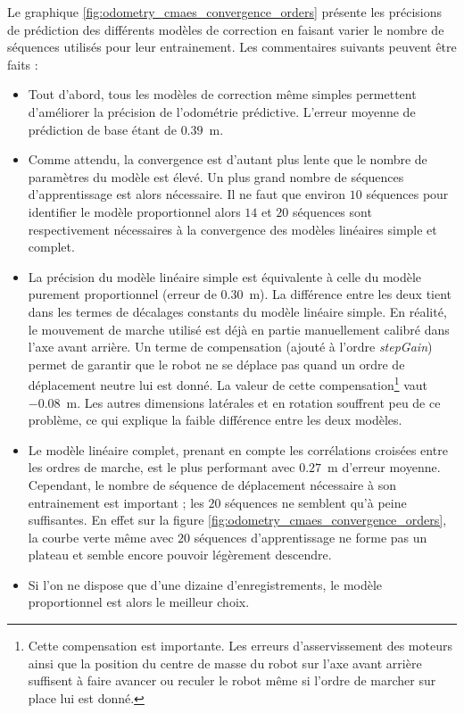 Le graphique \ref{fig:odometry_cmaes_convergence_orders} présente les précisions
de prédiction des différents modèles de correction
en faisant varier le nombre de séquences utilisés pour leur entrainement.
Les commentaires suivants peuvent être faits :
\begin{itemize}
    \item Tout d'abord, tous les modèles de correction 
        même simples permettent d'améliorer la précision 
        de l'odométrie prédictive.
        L'erreur moyenne de prédiction de base étant 
        de $0.39$~m.
    \item Comme attendu, la convergence est d'autant plus lente
        que le nombre de paramètres du modèle est élevé.
        Un plus grand nombre de séquences d'apprentissage est alors nécessaire.
        Il ne faut que environ $10$ séquences pour identifier le modèle
        proportionnel alors $14$ et $20$ séquences sont respectivement
        nécessaires à la convergence des modèles linéaires simple et complet.
    \item La précision du modèle linéaire simple est équivalente à celle
        du modèle purement proportionnel (erreur de $0.30$~m).
        La différence entre les deux tient dans les termes de décalages 
        constants du modèle linéaire simple.
        En réalité, le mouvement de marche utilisé est déjà en partie 
        manuellement calibré dans l'axe avant arrière.
        Un terme de compensation (ajouté à l'ordre \textit{stepGain}) permet
        de garantir que le robot ne se déplace pas quand un ordre de déplacement 
        neutre lui est donné.
        La valeur de cette compensation\footnote{Cette compensation est importante. 
        Les erreurs d'asservissement des moteurs ainsi que la position du centre de masse 
        du robot sur l'axe avant arrière suffisent à faire avancer ou reculer le robot 
        même si l'ordre de marcher sur place lui est donné.} vaut $-0.08$~m.
        Les autres dimensions latérales et en rotation souffrent 
        peu de ce problème, ce qui explique la faible différence entre
        les deux modèles.
    \item Le modèle linéaire complet, prenant en compte les corrélations croisées 
        entre les ordres de marche, est le plus performant avec 
        $0.27$~m d'erreur moyenne.
        Cependant, le nombre de séquence de déplacement nécessaire à son entrainement 
        est important ; les $20$ séquences ne semblent qu'à peine suffisantes.
        En effet sur la figure \ref{fig:odometry_cmaes_convergence_orders},
        la courbe verte même avec $20$ séquences d'apprentissage ne forme pas
        un plateau et semble encore pouvoir légèrement descendre.
    \item Si l'on ne dispose que d'une dizaine d'enregistrements, le modèle 
        proportionnel est alors le meilleur choix.\\
\end{itemize}

